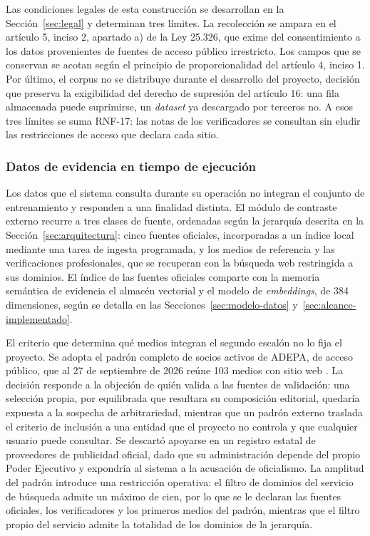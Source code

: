 Las condiciones legales de esta construcción se desarrollan en la Sección~\ref{sec:legal} y determinan tres límites. La recolección se ampara en el artículo 5, inciso 2, apartado a) de la Ley 25.326, que exime del consentimiento a los datos provenientes de fuentes de acceso público irrestricto. Los campos que se conservan se acotan según el principio de proporcionalidad del artículo 4, inciso 1. Por último, el corpus no se distribuye durante el desarrollo del proyecto, decisión que preserva la exigibilidad del derecho de supresión del artículo 16: una fila almacenada puede suprimirse, un \textit{dataset} ya descargado por terceros no. A esos tres límites se suma RNF-17: las notas de los verificadores se consultan sin eludir las restricciones de acceso que declara cada sitio.

\subsubsection{Datos de evidencia en tiempo de ejecución}

Los datos que el sistema consulta durante su operación no integran el conjunto de entrenamiento y responden a una finalidad distinta. El módulo de contraste externo recurre a tres clases de fuente, ordenadas según la jerarquía descrita en la Sección~\ref{sec:arquitectura}: cinco fuentes oficiales, incorporadas a un índice local mediante una tarea de ingesta programada, y los medios de referencia y las verificaciones profesionales, que se recuperan con la búsqueda web restringida a sus dominios. El índice de las fuentes oficiales comparte con la memoria semántica de evidencia el almacén vectorial y el modelo de \textit{embeddings}, de 384 dimensiones, según se detalla en las Secciones~\ref{sec:modelo-datos} y~\ref{sec:alcance-implementado}.

El criterio que determina qué medios integran el segundo escalón no lo fija el proyecto. Se adopta el padrón completo de socios activos de ADEPA, de acceso público, que al 27 de septiembre de 2026 reúne 103 medios con sitio web \parencite{ADEPA2026}. La decisión responde a la objeción de quién valida a las fuentes de validación: una selección propia, por equilibrada que resultara su composición editorial, quedaría expuesta a la sospecha de arbitrariedad, mientras que un padrón externo traslada el criterio de inclusión a una entidad que el proyecto no controla y que cualquier usuario puede consultar. Se descartó apoyarse en un registro estatal de proveedores de publicidad oficial, dado que su administración depende del propio Poder Ejecutivo y expondría al sistema a la acusación de oficialismo. La amplitud del padrón introduce una restricción operativa: el filtro de dominios del servicio de búsqueda admite un máximo de cien, por lo que se le declaran las fuentes oficiales, los verificadores y los primeros medios del padrón, mientras que el filtro propio del servicio admite la totalidad de los dominios de la jerarquía.

